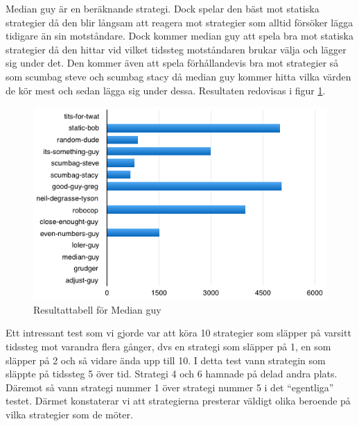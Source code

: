 \newpage

Median guy är en beräknande strategi. Dock spelar den bäst mot statiska strategier då den blir långsam att reagera mot strategier som alltid försöker lägga tidigare än sin motståndare. Dock kommer median guy att spela bra mot statiska strategier då den hittar vid vilket tidssteg motståndaren brukar välja och lägger sig under det. Den kommer även att spela förhållandevis bra mot strategier så som scumbag steve och scumbag stacy då median guy kommer hitta vilka värden de kör mest och sedan lägga sig under dessa. Resultaten redovisas i figur \ref{median-guy}.

\begin{figure}[H]
	\begin{center}
	\includegraphics[scale=0.75, angle=0]{bilder/median-guy.png}
	\caption{Resultattabell för Median guy}
	\label{median-guy}
	\end{center}
\end{figure}


Ett intressant test som vi gjorde var att köra 10 strategier som släpper på varsitt tidssteg mot varandra flera gånger, dvs en strategi som släpper på 1, en som släpper på 2 och så vidare ända upp till 10. I detta test vann strategin som släppte på tidssteg 5 över tid. Strategi 4 och 6 hamnade på delad andra plats. Däremot så vann strategi nummer 1 över strategi nummer 5 i det “egentliga” testet. Därmet konstaterar vi att strategierna presterar väldigt olika beroende på vilka strategier som de möter.

\newpage

